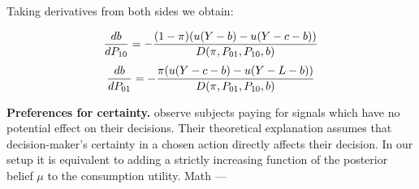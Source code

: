 \documentclass[12pt,a4paper]{article}
\begin{document}
Taking derivatives from both sides we obtain:

 $${db\over dP_{10}}=-{(1-\pi)(u(Y-b)-u(Y-c-b))\over D(\pi, P_{01}, P_{10}, b)}$$
$${db\over dP_{01}}=-{\pi(u(Y-c-b)-u(Y-L-b))\over D(\pi, P_{01}, P_{10}, b)}$$


\textbf{Preferences for certainty.} \citet{eliaz_paying_2010} observe subjects paying for signals which have no potential effect on their decisions. Their theoretical explanation assumes that decision-maker's certainty in a chosen action directly affects their decision. In our setup it is equivalent to adding a strictly increasing function of the posterior belief $\mu$ to the consumption utility. Math ---
\end{document}
